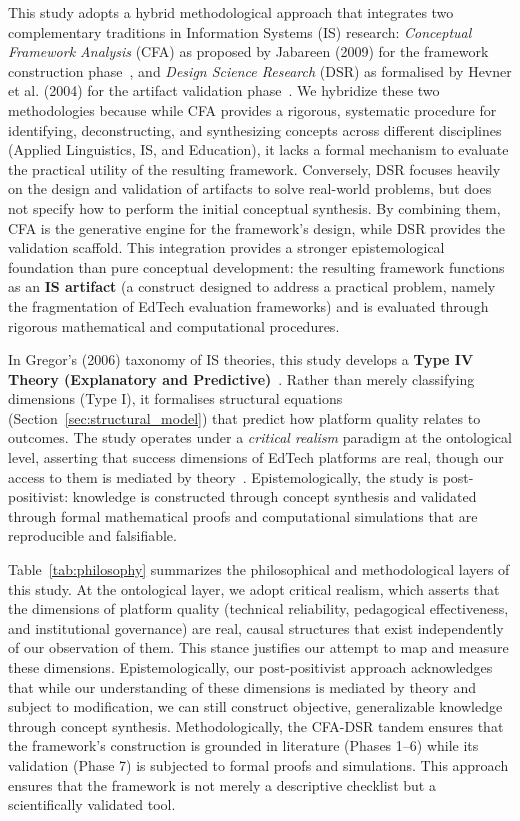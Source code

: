 \documentclass[11pt,a4paper]{article}
\begin{document}
This study adopts a hybrid methodological approach that integrates two complementary traditions in Information Systems (IS) research: \textit{Conceptual Framework Analysis} (CFA) as proposed by Jabareen (2009) for the framework construction phase~\cite{b6}, and \textit{Design Science Research} (DSR) as formalised by Hevner et al. (2004) for the artifact validation phase~\cite{b34}. We hybridize these two methodologies because while CFA provides a rigorous, systematic procedure for identifying, deconstructing, and synthesizing concepts across different disciplines (Applied Linguistics, IS, and Education), it lacks a formal mechanism to evaluate the practical utility of the resulting framework. Conversely, DSR focuses heavily on the design and validation of artifacts to solve real-world problems, but does not specify how to perform the initial conceptual synthesis. By combining them, CFA is the generative engine for the framework's design, while DSR provides the validation scaffold. This integration provides a stronger epistemological foundation than pure conceptual development: the resulting framework functions as an \textbf{IS artifact} (a construct designed to address a practical problem, namely the fragmentation of EdTech evaluation frameworks) and is evaluated through rigorous mathematical and computational procedures.

In Gregor's (2006) taxonomy of IS theories, this study develops a \textbf{Type IV Theory (Explanatory and Predictive)}~\cite{b35}. Rather than merely classifying dimensions (Type I), it formalises structural equations (Section~\ref{sec:structural_model}) that predict how platform quality relates to outcomes. The study operates under a \textit{critical realism} paradigm at the ontological level, asserting that success dimensions of EdTech platforms are real, though our access to them is mediated by theory~\cite{b7}. Epistemologically, the study is post-positivist: knowledge is constructed through concept synthesis and validated through formal mathematical proofs and computational simulations that are reproducible and falsifiable.

Table~\ref{tab:philosophy} summarizes the philosophical and methodological layers of this study. At the ontological layer, we adopt critical realism, which asserts that the dimensions of platform quality (technical reliability, pedagogical effectiveness, and institutional governance) are real, causal structures that exist independently of our observation of them. This stance justifies our attempt to map and measure these dimensions. Epistemologically, our post-positivist approach acknowledges that while our understanding of these dimensions is mediated by theory and subject to modification, we can still construct objective, generalizable knowledge through concept synthesis. Methodologically, the CFA-DSR tandem ensures that the framework's construction is grounded in literature (Phases 1--6) while its validation (Phase 7) is subjected to formal proofs and simulations. This approach ensures that the framework is not merely a descriptive checklist but a scientifically validated tool.
\end{document}
